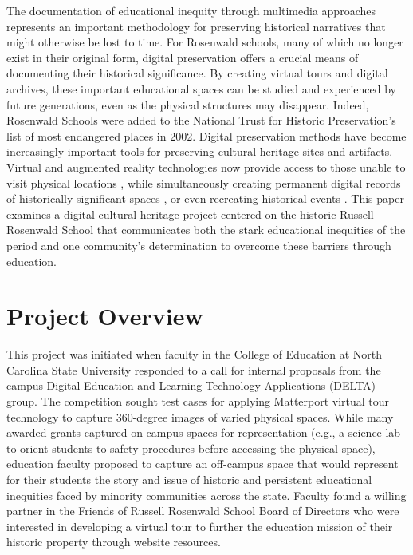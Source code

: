 \documentclass[final]{anthology-ch}  %
\begin{document}
The documentation of educational inequity through multimedia approaches represents an important methodology for preserving historical narratives that might otherwise be lost to time. For Rosenwald schools, many of which no longer exist in their original form, digital preservation offers a crucial means of documenting their historical significance. By creating virtual tours and digital archives, these important educational spaces can be studied and experienced by future generations, even as the physical structures may disappear. Indeed, Rosenwald Schools were added to the National Trust for Historic Preservation's list of most endangered places in 2002. Digital preservation methods have become increasingly important tools for preserving cultural heritage sites and artifacts. Virtual and augmented reality technologies now provide access to those unable to visit physical locations \cite{bekele2018survey}, while simultaneously creating permanent digital records of historically significant spaces \cite{paulauskas2023reconstruction}, or even recreating historical events \cite{desai2018recreation}. This paper examines a digital cultural heritage project centered on the historic Russell Rosenwald School that communicates both the stark educational inequities of the period and one community's determination to overcome these barriers through education.

\section{Project Overview}

This project was initiated when faculty in the College of Education at North Carolina State University responded to a call for internal proposals from the campus Digital Education and Learning Technology Applications (DELTA) group. The competition sought test cases for applying Matterport virtual tour technology to capture 360-degree images of varied physical spaces. While many awarded grants captured on-campus spaces for representation (e.g., a science lab to orient students to safety procedures before accessing the physical space), education faculty proposed to capture an off-campus space that would represent for their students the story and issue of historic and persistent educational inequities faced by minority communities across the state. Faculty found a willing partner in the Friends of Russell Rosenwald School Board of Directors who were interested in developing a virtual tour to further the education mission of their historic property through website resources.
\end{document}
